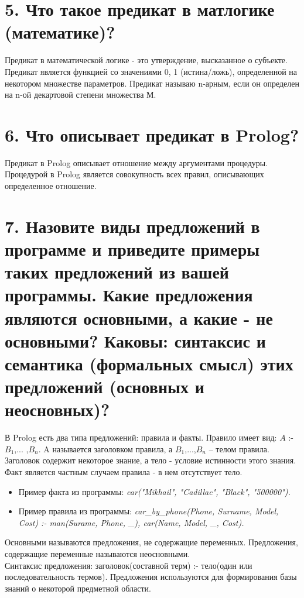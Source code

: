 \documentclass[12pt]{report}
\begin{document}
\section*{5. Что такое предикат в матлогике (математике)?}

Предикат в математической логике - это утверждение, высказанное о субъекте. Предикат является функцией со значениями {0, 1} (истина/ложь), определенной на некотором множестве параметров. Предикат называю n-арным, если он определен на n-ой декартовой степени множества М.

\section*{6. Что описывает предикат в Prolog?}

Предикат в Prolog описывает отношение между аргументами процедуры. Процедурой в Prolog является совокупность всех правил, описывающих определенное отношение.

\section*{7. Назовите виды предложений в программе и приведите примеры таких предложений из вашей программы. Какие предложения являются основными, а какие - не основными? Каковы: синтаксис и семантика (формальных смысл) этих предложений (основных и неосновных)?}

В Prolog есть два типа предложений: правила и факты. Правило имеет вид: $A$ :- $B_{1}$,... ,$B_{n}$. 
A называется заголовком правила, а $B_{1}$,...,$B_{n}$ – телом правила. Заголовок содержит некоторое знание, а тело - условие истинности этого знания. Факт является частным случаем правила - в нем отсутствует тело. 

\begin{itemize}
	\item Пример факта из программы: \emph{car("Mikhail"{}, "Cadillac"{}, "Black"{}, "500000"). }
	\item Пример правила из программы: \emph{car\_by\_phone(Phone, Surname, Model, Cost) :- man(Surame, Phone, \_), car(Name, Model, \_, Cost). }
\end{itemize}


Основными называются предложения, не содержащие переменных. Предложения, содержащие переменные называются неосновными.\\

Синтаксис предложения: заголовок(составной терм) :- тело(один или последовательность термов). Предложения используются для формирования базы знаний о некоторой предметной области.
\end{document}

